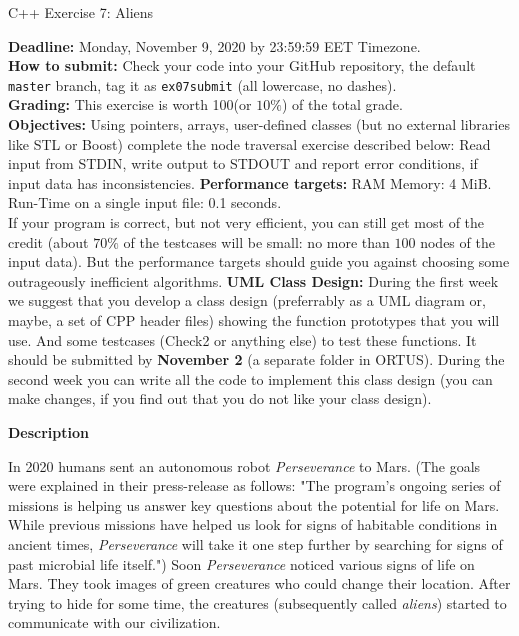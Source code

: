 \documentclass[11pt]{article}
\begin{document}
\thispagestyle{empty}


\begin{center}
{\Large C++ Exercise 7: Aliens}
\end{center}

{\bf Deadline:} Monday, November 9, 2020 by 23:59:59 EET Timezone.\\ 
{\bf How to submit:} Check your code into your GitHub repository, 
the default {\tt master} branch, 
tag it as {\tt ex07submit} (all lowercase, no dashes).\\
{\bf Grading:} This exercise is worth 100\textperthousand (or $10\%$) of the total grade.\\
{\bf Objectives:} Using pointers, arrays, user-defined classes (but no external libraries like STL 
or Boost) complete the node traversal exercise described below: Read input from STDIN, write output
to STDOUT and report error conditions, if input data has inconsistencies.
{\bf Performance targets:} RAM Memory: 4 MiB. Run-Time on a single input file: 0.1 seconds.\\ 
If your program is correct, but not very efficient, you can still 
get most of the credit (about $70\%$ of the testcases will be small: no more than $100$ nodes of the input data). 
But the performance targets should guide you against choosing some outrageously inefficient algorithms.
{\bf UML Class Design:} During the first week we suggest that you develop 
a class design (preferrably as a UML diagram or, maybe, a set of CPP header files) showing 
the function prototypes that you will use. And some testcases (Check2 or anything else) to test these functions. 
It should be submitted by {\bf November 2} (a separate folder in ORTUS). 
During the second week you can write all the code to implement this class design (you can make changes, 
if you find out that you do not like your class design).  



\vspace{20pt}
{\bf Description}

In 2020 humans sent an autonomous robot {\em Perseverance} to Mars. 
(The goals were explained in their press-release as follows: 
"The program's ongoing series of missions is helping us answer key questions 
about the potential for life on Mars. While previous missions have helped us 
look for signs of habitable conditions in ancient times, 
{\em Perseverance} will take it one step further by searching for signs of past microbial life itself.")
Soon {\em Perseverance} noticed various signs of life on Mars. They took images of green creatures 
who could change their location. After trying to hide for some time, the creatures (subsequently called {\em aliens}) 
started to communicate with our civilization.
\end{document}
